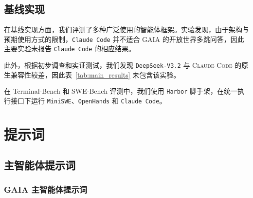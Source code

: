 \begin{table}[htbp]
\centering
{}
\caption{实验所用的 SFT 超参数。}
\label{tab:hyper_sft_qwen}
\end{table}


\subsection{基线实现}
\label{app:baseline_imp}
在基线实现方面，我们评测了多种广泛使用的智能体框架。实验发现，由于架构与预期使用方式的限制，\texttt{Claude Code} 并不适合 GAIA 的开放世界多跳问答，因此主要实验未报告 \texttt{Claude Code} 的相应结果。

此外，根据初步调查和实证测试，我们发现 \texttt{DeepSeek-V3.2} 与 \textsc{Claude Code} 的原生兼容性较差，因此表~\ref{tab:main_results} 未包含该实验。

在 Terminal-Bench 和 SWE-Bench 评测中，我们使用 \texttt{Harbor} 脚手架，在统一执行接口下运行 \texttt{MiniSWE}、\texttt{OpenHands} 和 \texttt{Claude Code}。


\section{提示词}
\label{app:prompt_used}

\subsection{主智能体提示词}
\label{app:B1}

\subsubsection{GAIA 主智能体提示词}
\label{app:B1_gaia}

